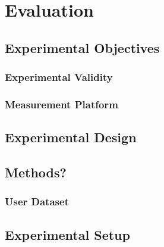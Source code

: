 \chapter{Evaluation}\label{C:evaluation}

\section{Experimental Objectives}

\subsection{Experimental Validity}

\subsection{Measurement Platform}

\section{Experimental Design}


\section{Methods?}

\subsection{User Dataset}



\section{Experimental Setup}


